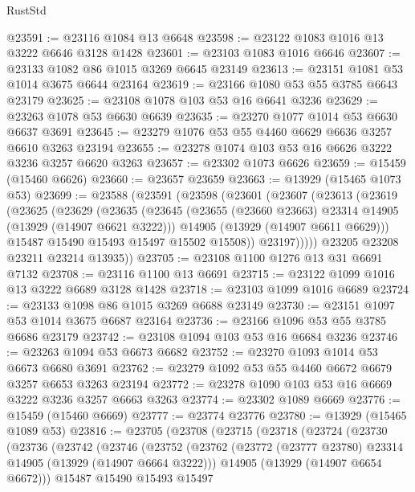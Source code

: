 \begin{lexlean}{RustStd}
\begin{coremodule}
@23591 := @23116 @1084 @13 @6648
@23598 := @23122 @1083 @1016 @13 @3222 @6646 @3128 @1428
@23601 := @23103 @1083 @1016 @6646
@23607 := @23133 @1082 @86 @1015 @3269 @6645 @23149
@23613 := @23151 @1081 @53 @1014 @3675 @6644 @23164
@23619 := @23166 @1080 @53 @55 @3785 @6643 @23179
@23625 := @23108 @1078 @103 @53 @16 @6641 @3236
@23629 := @23263 @1078 @53 @6630 @6639
@23635 := @23270 @1077 @1014 @53 @6630 @6637 @3691
@23645 := @23279 @1076 @53 @55 @4460 @6629 @6636 @3257 @6610 @3263 @23194
@23655 := @23278 @1074 @103 @53 @16 @6626 @3222 @3236 @3257 @6620 @3263
@23657 := @23302 @1073 @6626
@23659 := @15459 (@15460 @6626)
@23660 := @23657 @23659
@23663 := @13929 (@15465 @1073 @53)
@23699 := @23588
    (@23591
      (@23598
        (@23601
          (@23607
            (@23613
              (@23619
                (@23625
                  (@23629
                    (@23635
                      (@23645
                        (@23655 (@23660 @23663) @23314 @14905 (@13929 (@14907 @6621 @3222)))
                        @14905
                        (@13929 (@14907 @6611 @6629)))
                      @15487
                      @15490
                      @15493
                      @15497
                      @15502
                      @15508))
                  @23197)))))
        @23205
        @23208
        @23211
        @23214
        @13935))
@23705 := @23108 @1100 @1276 @13 @31 @6691 @7132
@23708 := @23116 @1100 @13 @6691
@23715 := @23122 @1099 @1016 @13 @3222 @6689 @3128 @1428
@23718 := @23103 @1099 @1016 @6689
@23724 := @23133 @1098 @86 @1015 @3269 @6688 @23149
@23730 := @23151 @1097 @53 @1014 @3675 @6687 @23164
@23736 := @23166 @1096 @53 @55 @3785 @6686 @23179
@23742 := @23108 @1094 @103 @53 @16 @6684 @3236
@23746 := @23263 @1094 @53 @6673 @6682
@23752 := @23270 @1093 @1014 @53 @6673 @6680 @3691
@23762 := @23279 @1092 @53 @55 @4460 @6672 @6679 @3257 @6653 @3263 @23194
@23772 := @23278 @1090 @103 @53 @16 @6669 @3222 @3236 @3257 @6663 @3263
@23774 := @23302 @1089 @6669
@23776 := @15459 (@15460 @6669)
@23777 := @23774 @23776
@23780 := @13929 (@15465 @1089 @53)
@23816 := @23705
    (@23708
      (@23715
        (@23718
          (@23724
            (@23730
              (@23736
                (@23742
                  (@23746
                    (@23752
                      (@23762
                        (@23772 (@23777 @23780) @23314 @14905 (@13929 (@14907 @6664 @3222)))
                        @14905
                        (@13929 (@14907 @6654 @6672)))
                      @15487
                      @15490
                      @15493
                      @15497

\end{coremodule}
\end{lexlean}
